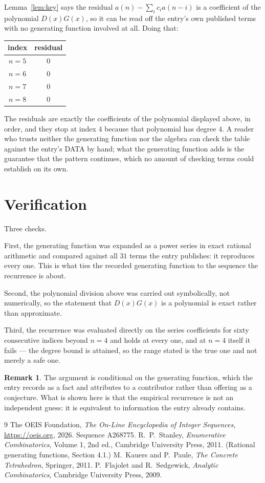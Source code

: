 \documentclass[11pt,a4paper]{article}
\theoremstyle{plain}
\theoremstyle{definition}
\newtheorem{remark}[theorem]{Remark}
\begin{document}
Lemma~\ref{lem:key} says the residual $a(n)-\sum_ic_ia(n-i)$ is a coefficient of the
polynomial $D(x)G(x)$, so it can be read off the entry's own published terms with no
generating function involved at all. Doing that:
\begin{center}
\begin{tabular}{cc}
index & residual \\ \hline
$n=5$ & $0$ \\
$n=6$ & $0$ \\
$n=7$ & $0$ \\
$n=8$ & $0$
\end{tabular}
\end{center}
The residuals are exactly the coefficients of the polynomial displayed above, in order, and
they stop at index $4$ because that polynomial has degree $4$. A reader who trusts
neither the generating function nor the algebra can check the table against the entry's DATA
by hand; what the generating function adds is the guarantee that the pattern continues, which
no amount of checking terms could establish on its own.

\section{Verification}

Three checks.

First, the generating function was expanded as a power series in exact rational arithmetic and
compared against all $31$ terms the entry publishes: it reproduces every one. This is
what ties the recorded generating function to the sequence the recurrence is about.

Second, the polynomial division above was carried out symbolically, not numerically, so the
statement that $D(x)G(x)$ is a polynomial is exact rather than approximate.

Third, the recurrence was evaluated directly on the series coefficients for sixty consecutive
indices beyond $n=4$ and holds at every one, and at $n=4$ itself it fails --- the
degree bound is attained, so the range stated is the true one and not merely a safe one.

\begin{remark}
The argument is conditional on the generating function, which the entry records as a fact and
attributes to a contributor rather than offering as a conjecture. What is shown here is that
the empirical recurrence is not an independent guess: it is equivalent to information the
entry already contains.
\end{remark}

\begin{thebibliography}{9}
 The OEIS Foundation, \emph{The On-Line Encyclopedia of Integer
Sequences}, \url{https://oeis.org}, 2026. Sequence A268775.
 R.~P.~Stanley, \emph{Enumerative Combinatorics}, Volume 1, 2nd ed.,
Cambridge University Press, 2011. (Rational generating functions, Section 4.1.)
 M.~Kauers and P.~Paule, \emph{The Concrete Tetrahedron}, Springer, 2011.
 P.~Flajolet and R.~Sedgewick, \emph{Analytic Combinatorics}, Cambridge
University Press, 2009.
\end{thebibliography}
\end{document}
